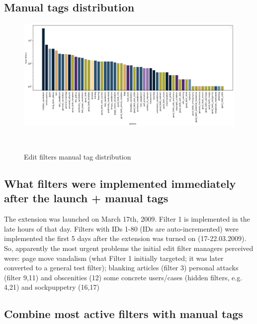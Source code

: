 \subsection{Manual tags distribution}
\begin{figure}
\centering
  \includegraphics[width=0.9\columnwidth]{pics/manual-tags-distribution.png}
  \caption{Edit filters manual tag distribution}~\label{fig:manual-tags}
\end{figure}

\subsection{What filters were implemented immediately after the launch + manual tags}
The extension was launched on March 17th, 2009.
Filter 1 is implemented in the late hours of that day.
Filters with IDs 1-80 (IDs are auto-incremented) were implemented the first 5 days after the extension was turned on (17-22.03.2009).
So, apparently the most urgent problems the initial edit filter managers perceived were:
page move vandalism (what Filter 1 initially targeted; it was later converted to a general test filter);
blanking articles (filter 3)
personal attacks (filter 9,11) and obscenities (12)
some concrete users/cases (hidden filters, e.g. 4,21) and sockpuppetry (16,17)

\subsection{Combine most active filters with manual tags}


